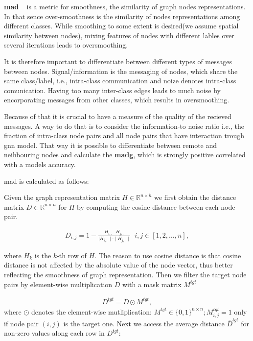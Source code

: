 \textbf{\Ac{mad}} ~\cite{Chen2020} is a metric for smoothness, the similarity of graph nodes representations. In that sence over-smoothness is the similarity of nodes representations among different classes.
While smoothing to some extent is desired(we assume spatial similarity between nodes), mixing features of nodes with different lables over several iterations leads to oversmoothing.

It is therefore important to differentiate between different types of messages between nodes. Signal/information is the messaging of nodes, which share the same class/label, i.e., intra-class communication and noize denotes intra-class comunication. Having too many inter-class edges leads to much noise by encorporating messages from other classes, which results in oversmoothing.

Because of that it is crucial to have a measure of the quality of the recieved messages. A way to do that is to consider the information-to noise ratio i.e., the fraction of intra-class node pairs and all node pairs that have interaction trough \ac{gnn} model. That way it is possible to differentiate between remote and neihbouring nodes and calculate the \textbf{\ac{madg}}, which is strongly positive correlated with a models accuracy.

\ac{mad} is calculated as follows:

Given the graph representation matrix $H \in \mathbb{R}^{n \times h}$ we
first obtain the distance matrix $D \in \mathbb{R}^{n \times n}$ for $H$ by
computing the cosine distance between each node pair.

\begin{align*}
    D_{i,j} = 1 - \frac{H_{i,:} \cdot H_{j,:}}{\mid H_{i,:}\mid  \cdot \mid H_{j,:}\mid} \; \;  i,j \in [1,2, \dots, n],
\end{align*}

where $H_{k}$ is the $k$-th row of $H$. The reason to use cosine distance is that cosine distance is not affected by the absolute value of the node vector,
thus better reflecting the smoothness of graph representation. Then we filter the target node pairs by element-wise multiplication $D$ with a mask matrix $M^{tgt}$

\begin{align*}
    D^{tgt} = D \odot M^{tgt},
\end{align*}
where $\odot$ denotes the element-wise mutliplication: $M^{tgt} \in \{0,1\}^{n \times n}; M_{i,j}^{tgt}= 1$ only if node pair $(i,j)$ is the target one.
Next we access the average distance $\bar{D}^{tgt}$ for non-zero values along each row in $D^{tgt}:$

